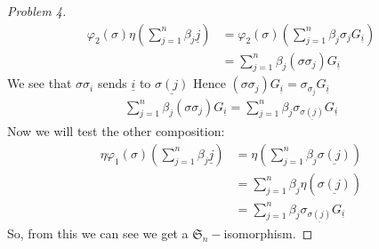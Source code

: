 \documentclass[titlepage]{article}
\theoremstyle{plain}
\theoremstyle{definition}
\theoremstyle{remark}
\theoremstyle{exercise-style}
\numberwithin{equation}{section}
\numberwithin{theorem}{section}
\numberwithin{remark}{section}
\begin{document}
\begin{proof}[Problem 4]
\begin{align}
        \varphi_2(\sigma)\eta \left ( \sum_{j =1}^n \beta_j \underline{j} \right ) &= \varphi_2(\sigma) \left (\sum_{j =1}^n \beta_j\sigma_j G_{\underline{i}} \right ) \\
        &= \sum_{j =1}^n \beta_j(\sigma\sigma_j )G_{\underline{i}}
    \end{align}
    We see that $\sigma \sigma_i$ sends $\underline{i}$ to $\underline{\sigma(j)}$ Hence $(\sigma \sigma_j)G_{\underline{i}}=\sigma_{\sigma_j} G_{\underline{i}}$
    \begin{align}
        \sum_{j =1}^n \beta_j(\sigma\sigma_j )G_{\underline{i}} = \sum_{j =1}^n \beta_j \sigma_{\underline{\sigma(j)}} G_{\underline{i}} 
    \end{align}
    Now we will test the other composition:
    \begin{align}
        \eta \varphi_1(\sigma)\left ( \sum_{j =1}^n \beta_j \underline{j} \right ) &= \eta \left ( \sum_{j =1}^n \beta_j \underline{\sigma(j)}\right ) \\
        &= \sum_{j =1}^n \beta_j \eta \left ( \underline{\sigma(j)} \right ) \\
        &= \sum_{j =1}^n \beta_j \sigma_{\underline{\sigma(j)}} G_{\underline{i}}
    \end{align}
    So, from this we can see we get a $\mathfrak{S}_n-$isomorphism.
\end{proof}
\end{document}
